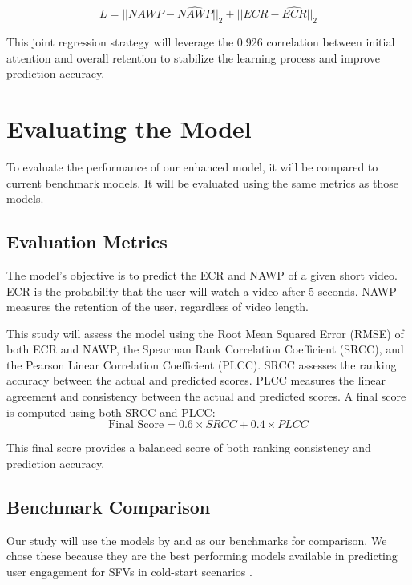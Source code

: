 \begin{equation}
    L = ||NAWP - \widehat{NAWP}||_2 + ||ECR - \widehat{ECR}||_2
\end{equation}

This joint regression strategy will leverage the 0.926 correlation between initial attention and overall retention to stabilize the learning process and improve prediction accuracy.



\section{Evaluating the Model}

To evaluate the performance of our enhanced model, it will be compared to current benchmark models. It will be evaluated using the same metrics as those models.

\subsection{Evaluation Metrics}

The model's objective is to predict the ECR and NAWP of a given short video. ECR is the probability that the user will watch a video after 5 seconds. NAWP measures the retention of the user, regardless of video length.

This study will assess the model using the Root Mean Squared Error (RMSE) of both ECR and NAWP, the Spearman Rank Correlation Coefficient (SRCC), and the Pearson Linear Correlation Coefficient (PLCC). SRCC assesses the ranking accuracy between the actual and predicted scores. PLCC measures the linear agreement and consistency between the actual and predicted scores. A final score is computed using both SRCC and PLCC: 
\begin{equation}
    \text{Final Score} = 0.6\times SRCC + 0.4\times PLCC
\end{equation}

This final score provides a balanced score of both ranking consistency and prediction accuracy.

\subsection{Benchmark Comparison}

Our study will use the models by \citeauthor{sun2025engagement} and \citeauthor{guan2025mmf} as our benchmarks for comparison. We chose these because they are the best performing models available in predicting user engagement for SFVs in cold-start scenarios \cite{li2025vquala}.

